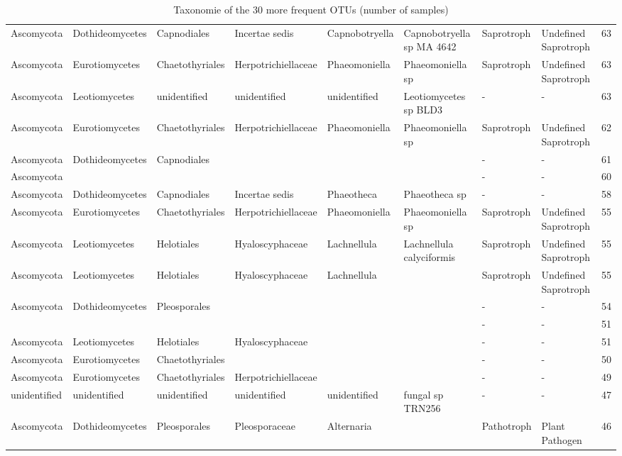 \documentclass[12pt]{article}\usepackage[]{graphicx}\usepackage[]{color}
\numberwithin{figure}{section}
\begin{document}
\begin{landscape}
\begin{table}[ht]
\begin{tabular}{llllllllr}
  Ascomycota & Dothideomycetes & Capnodiales & Incertae sedis & Capnobotryella & Capnobotryella sp MA 4642 & Saprotroph & Undefined Saprotroph & 63 \\ 
  Ascomycota & Eurotiomycetes & Chaetothyriales & Herpotrichiellaceae & Phaeomoniella & Phaeomoniella sp & Saprotroph & Undefined Saprotroph & 63 \\ 
  Ascomycota & Leotiomycetes & unidentified & unidentified & unidentified & Leotiomycetes sp BLD3 & - & - & 63 \\ 
  Ascomycota & Eurotiomycetes & Chaetothyriales & Herpotrichiellaceae & Phaeomoniella & Phaeomoniella sp & Saprotroph & Undefined Saprotroph & 62 \\ 
  Ascomycota & Dothideomycetes & Capnodiales &  &  &  & - & - & 61 \\ 
  Ascomycota &  &  &  &  &  & - & - & 60 \\ 
  Ascomycota & Dothideomycetes & Capnodiales & Incertae sedis & Phaeotheca & Phaeotheca sp & - & - & 58 \\ 
  Ascomycota & Eurotiomycetes & Chaetothyriales & Herpotrichiellaceae & Phaeomoniella & Phaeomoniella sp & Saprotroph & Undefined Saprotroph & 55 \\ 
  Ascomycota & Leotiomycetes & Helotiales & Hyaloscyphaceae & Lachnellula & Lachnellula calyciformis & Saprotroph & Undefined Saprotroph & 55 \\ 
  Ascomycota & Leotiomycetes & Helotiales & Hyaloscyphaceae & Lachnellula &  & Saprotroph & Undefined Saprotroph & 55 \\ 
  Ascomycota & Dothideomycetes & Pleosporales &  &  &  & - & - & 54 \\ 
   &  &  &  &  &  & - & - & 51 \\ 
  Ascomycota & Leotiomycetes & Helotiales & Hyaloscyphaceae &  &  & - & - & 51 \\ 
  Ascomycota & Eurotiomycetes & Chaetothyriales &  &  &  & - & - & 50 \\ 
  Ascomycota & Eurotiomycetes & Chaetothyriales & Herpotrichiellaceae &  &  & - & - & 49 \\ 
  unidentified & unidentified & unidentified & unidentified & unidentified & fungal sp TRN256 & - & - & 47 \\ 
  Ascomycota & Dothideomycetes & Pleosporales & Pleosporaceae & Alternaria &  & Pathotroph & Plant Pathogen & 46 \\ 
   \hline
\end{tabular}
\endgroup
\caption{Taxonomie of the 30 more frequent OTUs (number of samples)} 
\end{table}

\end{landscape}
\end{document}
